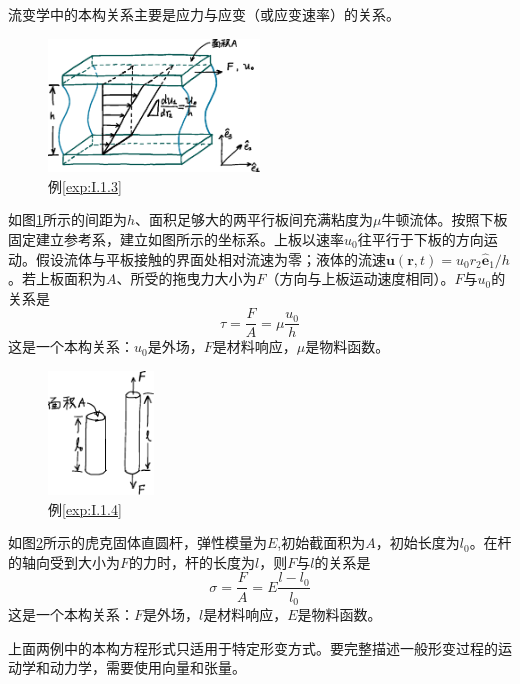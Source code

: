 \documentclass[main.tex]{subfiles}
\begin{document}
流变学中的本构关系主要是应力与应变（或应变速率）的关系。

\begin{figure}[h]
\centering
\includegraphics[width=0.5\textwidth]{images/I.1.3.eps}
\caption{例\ref{exp:I.1.3}}
\label{fig:I.1.3}
\end{figure}

\begin{example}[简单剪切下的牛顿流体本构关系]\label{exp:I.1.3}
如图\ref{fig:I.1.3}所示的间距为$h$、面积足够大的两平行板间充满粘度为$\mu$牛顿流体。按照下板固定建立参考系，建立如图所示的坐标系。上板以速率$u_0$往平行于下板的方向运动。假设流体与平板接触的界面处相对流速为零；液体的流速$\mathbf{u}\left(\mathbf{r},t\right)=u_0r_2\mathbf{\hat{e}}_1/h$。若上板面积为$A$、所受的拖曳力大小为$F$（方向与上板运动速度相同）。$F$与$u_0$的关系是
\[
\tau=\frac{F}{A}=\mu\frac{u_0}{h}
\]
这是一个本构关系：$u_0$是外场，$F$是材料响应，$\mu$是物料函数。
\end{example}

\begin{figure}[h]
\centering
\includegraphics[width=0.25\textwidth]{images/I.1.4.eps}
\caption{例\ref{exp:I.1.4}}
\label{fig:I.1.4}
\end{figure}

\begin{example}[轴向拉伸下的虎克固体本构关系]\label{exp:I.1.4}
如图\ref{fig:I.1.4}所示的虎克固体直圆杆，弹性模量为$E$,初始截面积为$A$，初始长度为$l_0$。在杆的轴向受到大小为$F$的力时，杆的长度为$l$，则$F$与$l$的关系是
\[
\sigma=\frac{F}{A}=E\frac{l-l_0}{l_0}
\]
这是一个本构关系：$F$是外场，$l$是材料响应，$E$是物料函数。
\end{example}
上面两例中的本构方程形式只适用于特定形变方式。要完整描述一般形变过程的运动学和动力学，需要使用向量和张量。
\end{document}
